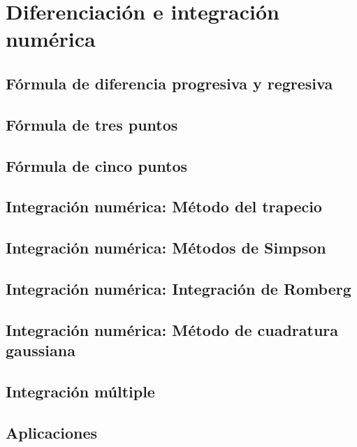 \chapter{Diferenciación e integración numérica}

\section{Fórmula de diferencia progresiva y regresiva}
\section{Fórmula de tres puntos}
\section{Fórmula de cinco puntos}
\section{Integración numérica: Método del trapecio}
\section{Integración numérica: Métodos de Simpson}
\section{Integración numérica: Integración de Romberg}
\section{Integración numérica: Método de cuadratura gaussiana}
\section{Integración múltiple}
\section{Aplicaciones}